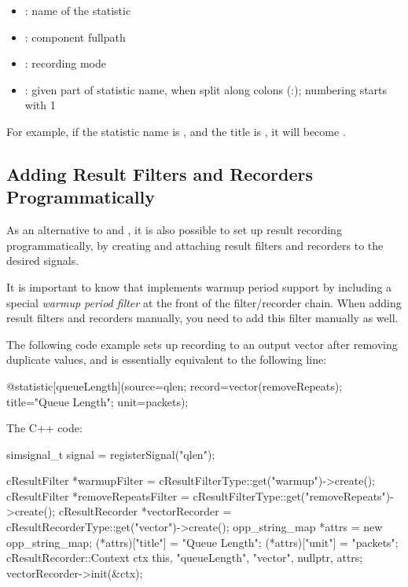 \begin{ned}
\begin{itemize}
  \item {}: name of the statistic
  \item {}: component fullpath
  \item {}: recording mode
  \item {}: given part of statistic name, when split
    along colons (:); numbering starts with 1
\end{itemize}

For example, if the statistic name is ,
and the title is , it will become
.


\subsection{Adding Result Filters and Recorders Programmatically}
\label{sec:simple-modules:statistic-recording-programmatically}

As an alternative to  and ,
it is also possible to set up result recording programmatically, by creating and
attaching result filters and recorders to the desired signals.

\begin{note}
It is important to know that  implements warmup period
support by including a special \textit{warmup period filter} at the
front of the filter/recorder chain. When adding result filters and recorders
manually, you need to add this filter manually as well.
\end{note}

The following code example sets up recording to an output vector after
removing duplicate values, and is essentially equivalent to the following
 line:

\begin{ned}
@statistic[queueLength](source=qlen; record=vector(removeRepeats);
                        title="Queue Length"; unit=packets);
\end{ned}

The C++ code:

\begin{cpp}
simsignal_t signal = registerSignal("qlen");

cResultFilter *warmupFilter =
        cResultFilterType::get("warmup")->create();
cResultFilter *removeRepeatsFilter =
        cResultFilterType::get("removeRepeats")->create();
cResultRecorder *vectorRecorder =
        cResultRecorderType::get("vector")->create();
opp_string_map *attrs = new opp_string_map;
(*attrs)["title"] = "Queue Length";
(*attrs)["unit"] = "packets";
cResultRecorder::Context ctx { this, "queueLength", "vector",
                               nullptr, attrs};
vectorRecorder->init(&ctx);


\end{cpp}
\end{ned}
